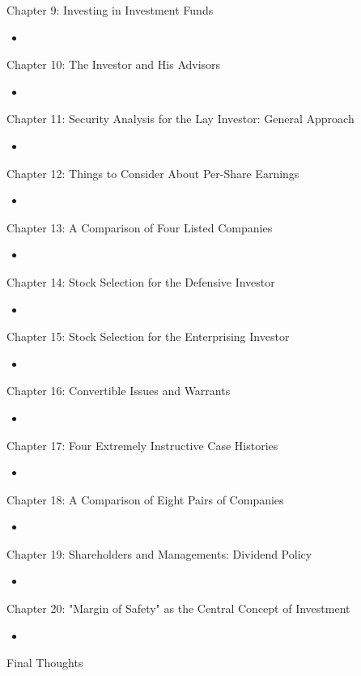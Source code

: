 \documentclass{article}
\begin{document}
\Large Chapter 9: Investing in Investment Funds
\begin{itemize}
	\item
\end{itemize}

\Large Chapter 10: The Investor and His Advisors
\begin{itemize}
	\item
\end{itemize}

\Large Chapter 11: Security Analysis for the Lay Investor: General Approach
\begin{itemize}
	\item
\end{itemize}

\Large Chapter 12: Things to Consider About Per-Share Earnings
\begin{itemize}
	\item
\end{itemize}

\Large Chapter 13: A Comparison of Four Listed Companies
\begin{itemize}
	\item
\end{itemize}

\Large Chapter 14: Stock Selection for the Defensive Investor
\begin{itemize}
	\item
\end{itemize}

\Large Chapter 15: Stock Selection for the Enterprising Investor
\begin{itemize}
	\item
\end{itemize}

\Large Chapter 16: Convertible Issues and Warrants
\begin{itemize}
	\item
\end{itemize}

\Large Chapter 17: Four Extremely Instructive Case Histories
\begin{itemize}
	\item
\end{itemize}

\Large Chapter 18: A Comparison of Eight Pairs of Companies
\begin{itemize}
	\item
\end{itemize}

\Large Chapter 19: Shareholders and Managements: Dividend Policy
\begin{itemize}
	\item
\end{itemize}

\Large Chapter 20: "Margin of Safety" as the Central Concept of Investment
\begin{itemize}
	\item
\end{itemize}

\hrulefill

Final Thoughts
\end{document}
